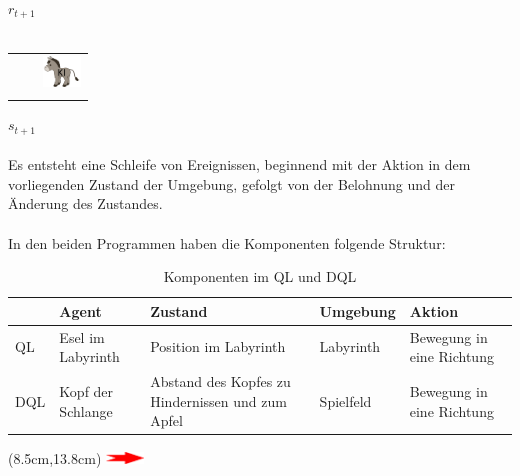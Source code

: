 \documentclass[12pt,titlepage]{article}
\begin{document}
$r_{t+1}$\\\\
\begin{tabular}{c|p{1cm}|p{1cm}}
&&\\
\hline
&& \includegraphics[width=1cm]{AI.png}\\
\hline
&&
\end{tabular}
$s_{t+1}$
\\\\
Es entsteht eine Schleife von Ereignissen, beginnend mit der Aktion in dem vorliegenden Zustand der Umgebung, gefolgt von der Belohnung und der Änderung des Zustandes.
\\\\
In den beiden Programmen haben die Komponenten folgende Struktur:
\\
\begin{table}
[ht] \caption{Komponenten im QL und DQL} \label{tab:KQL}
\begin{tabular}{|l|l|p{}|l|p{}|}
\hline
& Agent & Zustand & Umgebung & Aktion 
\\ \hline
QL & Esel im Labyrinth & Position im Labyrinth & Labyrinth & Bewegung in eine Richtung 
\\ \hline
DQL & Kopf der Schlange & Abstand des Kopfes zu Hindernissen und zum Apfel & Spielfeld & Bewegung in eine Richtung \\ \hline
\end{tabular}
\end{table}

\begin{textblock*}{2cm}(8.5cm,13.8cm)
\includegraphics[width=1cm]{Action.png}
\end{textblock*}
\end{document}
